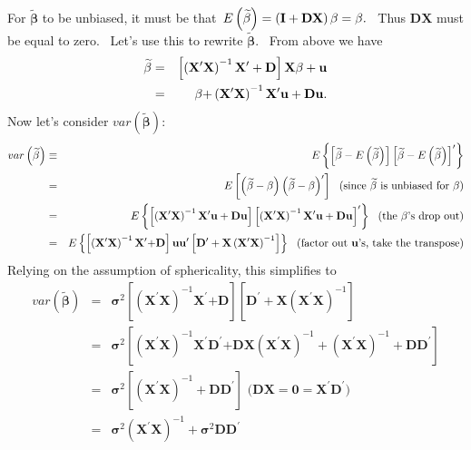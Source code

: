 \documentclass[11pt]{article}
\begin{document}
For $\widetilde{\mathbf{\beta }}$ to be unbiased, it must be that\ $E\left( 
\widetilde{\mathbf{\beta }}\right) =\left( \mathbf{I+DX}\right) \mathbf{%
\beta =\beta .}$ \ Thus $\mathbf{DX}$ must be equal to zero. \ Let's use
this to rewrite $\widetilde{\mathbf{\beta }}.$ \ From above we have%
\begin{eqnarray*}
\widetilde{\mathbf{\beta }} &=&\left[ \left( \mathbf{X}^{\prime }\mathbf{X}%
\right) ^{-1}\mathbf{X}^{\prime }+\mathbf{D}\right] \mathbf{X\beta }+\mathbf{%
u} \\
&=&\mathbf{\beta +}\left( \mathbf{X}^{\prime }\mathbf{X}\right) ^{-1}\mathbf{%
X}^{\prime }\mathbf{u+Du.}
\end{eqnarray*}
Now let's consider $var\left( \widetilde{\mathbf{\beta }}\right) :$%
\begin{eqnarray*}
var\left( \widetilde{\mathbf{\beta }}\right)  &\equiv &E\left\{ \left[ 
\widetilde{\mathbf{\beta }}-E\left( \widetilde{\mathbf{\beta }}\right) %
\right] \left[ \widetilde{\mathbf{\beta }}-E\left( \widetilde{\mathbf{\beta }%
}\right) \right] ^{\prime }\right\}  \\
&=&E\left[ \left( \widetilde{\mathbf{\beta }}-\mathbf{\beta }\right) \left( 
\widetilde{\mathbf{\beta }}-\mathbf{\beta }\right) ^{\prime }\right] \text{
\ (since }\widetilde{\mathbf{\beta }}\text{ is unbiased for }\mathbf{\beta }%
\text{)} \\
&=&E\left\{ \left[ \left( \mathbf{X}^{\prime }\mathbf{X}\right) ^{-1}\mathbf{%
X}^{\prime }\mathbf{u+Du}\right] \left[ \left( \mathbf{X}^{\prime }\mathbf{X}%
\right) ^{-1}\mathbf{X}^{\prime }\mathbf{u+Du}\right] ^{\prime }\right\} 
\text{ \ (the }\mathbf{\beta }\text{'s drop out)} \\
&=&E\left\{ \left[ \left( \mathbf{X}^{\prime }\mathbf{X}\right) ^{-1}\mathbf{%
X}^{\prime }\mathbf{+D}\right] \mathbf{uu}^{\prime }\left[ \mathbf{D}%
^{\prime }+\mathbf{X}\left( \mathbf{X}^{\prime }\mathbf{X}\right) ^{-1}%
\right] \right\} \text{ \ (factor out }\mathbf{u}\text{'s, take the
transpose)}
\end{eqnarray*}%
Relying on the assumption of sphericality, this simplifies to 
\begin{eqnarray*}
var\left( \widetilde{\mathbf{\beta }}\right)  &=&\mathbf{\sigma }^{2}\left[
\left( \mathbf{X}^{\prime }\mathbf{X}\right) ^{-1}\mathbf{X}^{\prime }%
\mathbf{+D}\right] \left[ \mathbf{D}^{\prime }+\mathbf{X}\left( \mathbf{X}%
^{\prime }\mathbf{X}\right) ^{-1}\right]  \\
&=&\mathbf{\sigma }^{2}\left[ \left( \mathbf{X}^{\prime }\mathbf{X}\right)
^{-1}\mathbf{X}^{\prime }\mathbf{D}^{\prime }\mathbf{+DX}\left( \mathbf{X}%
^{\prime }\mathbf{X}\right) ^{-1}+\left( \mathbf{X}^{\prime }\mathbf{X}%
\right) ^{-1}+\mathbf{DD}^{\prime }\right]  \\
&=&\mathbf{\sigma }^{2}\left[ \left( \mathbf{X}^{\prime }\mathbf{X}\right)
^{-1}+\mathbf{DD}^{\prime }\right] \text{ \ (}\mathbf{DX=0=X}^{\prime }%
\mathbf{D}^{\prime }\text{)} \\
&=&\mathbf{\sigma }^{2}\left( \mathbf{X}^{\prime }\mathbf{X}\right) ^{-1}+%
\mathbf{\sigma }^{2}\mathbf{DD}^{\prime }
\end{eqnarray*}%
\end{document}
